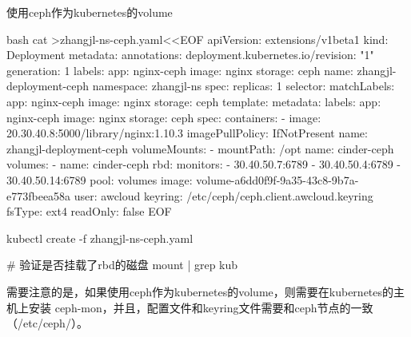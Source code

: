 \begin{outline}[enumerate]
\1 使用ceph作为kubernetes的volume
\begin{code-in-enumerate}{bash}
cat >zhangjl-ns-ceph.yaml<<EOF
apiVersion: extensions/v1beta1
kind: Deployment
metadata:
  annotations:
    deployment.kubernetes.io/revision: "1"
  generation: 1
  labels:
    app: nginx-ceph
    image: nginx
    storage: ceph
  name: zhangjl-deployment-ceph
  namespace: zhangjl-ns
spec:
  replicas: 1
  selector:
    matchLabels:
      app: nginx-ceph
      image: nginx
      storage: ceph
  template:
    metadata:
      labels:
        app: nginx-ceph
        image: nginx
        storage: ceph
    spec:
      containers:
      - image: 20.30.40.8:5000/library/nginx:1.10.3
        imagePullPolicy: IfNotPresent
        name: zhangjl-deployment-ceph
        volumeMounts:
        - mountPath: /opt
          name: cinder-ceph
      volumes:
      - name: cinder-ceph
        rbd:
          monitors:
          - 30.40.50.7:6789
          - 30.40.50.4:6789
          - 30.40.50.14:6789
          pool: volumes
          image: volume-a6dd0f9f-9a35-43c8-9b7a-e773fbeea58a
          user: awcloud
          keyring: /etc/ceph/ceph.client.awcloud.keyring
          fsType: ext4
          readOnly: false
EOF

kubectl create -f zhangjl-ns-ceph.yaml

# 验证是否挂载了rbd的磁盘
mount | grep kub
\end{code-in-enumerate}
需要注意的是，如果使用ceph作为kubernetes的volume，则需要在kubernetes的主机上安装
ceph-mon，并且，配置文件和keyring文件需要和ceph节点的一致（/etc/ceph/）。


\end{outline}
